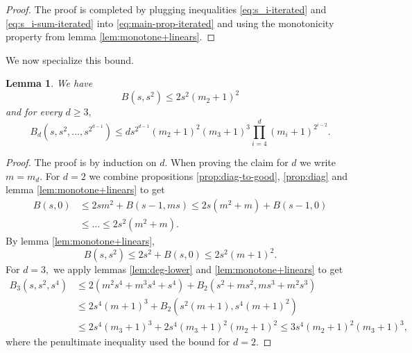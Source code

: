 \documentclass[10pt,a4paper]{amsart}
\newtheorem{lemma}[theorem]{Lemma}
\theoremstyle{definition}
\begin{document}
\begin{proof}
The proof is completed by plugging inequalities \eqref{eq:s_i-iterated} and \eqref{eq:s_i-sum-iterated} into \eqref{eq:main-prop-iterated} and using the monotonicity property from lemma \ref{lem:monotone+linears}.
\end{proof}

We now specialize this bound.

\begin{lemma}\label{lem:powers-bound}
    We have 
    \[
    B(s,s^2) \le 2s^2(m_2+1)^2
    \]
    and for every $d\ge 3,$
    \[
    B_d(s,s^2,\ldots,s^{2^{d-1}}) \le d s^{2^{d-1}} (m_2+1)^2(m_3+1)^3\prod_{i=4}^d (m_i+1)^{2^{i-2}}. 
    \]
\end{lemma}

\begin{proof}
    The proof is by induction on $d.$ When proving the claim for $d$ we write $m = m_d.$ For $d=2$ we combine propositions \ref{prop:diag-to-good}, \ref{prop:diag} and lemma \ref{lem:monotone+linears} to get
    \begin{align*}
        B(s,0) &\le  2sm^2 +B(s-1,ms) \le 2s(m^2+m) +B(s-1,0) \\
        &\le \ldots \le 2s^2 (m^2+m).
    \end{align*}
    By lemma \ref{lem:monotone+linears},  
    \[
    B(s,s^2) \le 2s^2+B(s,0) \le 2s^2(m+1)^2.
    \]
    For $d = 3,$ we apply lemmas \ref{lem:deg-lower} and \ref{lem:monotone+linears} to get
     \begin{align*}
        B_3(s,s^2,s^4) &\le  2(m^2s^4 + m^3s^4+s^4) + B_2(s^2+ms^2,ms^3+m^2s^3)  \\
    &\le 2s^4(m+1)^3 + B_2(s^2(m+1),s^4(m+1)^2) \\
    &\le 2s^4(m_3+1)^3 + 2s^4(m_3+1)^2(m_2+1)^2 \le 3s^4 (m_2+1)^2(m_3+1)^3,
    \end{align*}
    where the penultimate inequality used the bound for $d=2.$ 


\end{proof}
\end{document}
